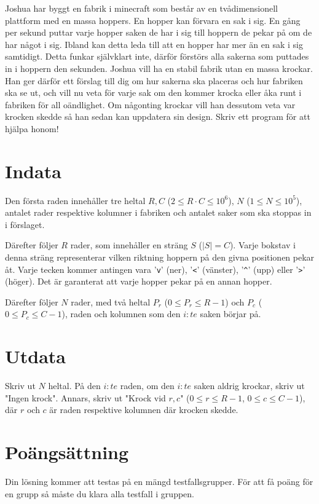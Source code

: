Joshua har byggt en fabrik i minecraft som består av en tvådimensionell plattform med en massa hoppers. En hopper kan förvara en sak i sig.
En gång per sekund puttar varje hopper saken de har i sig till hoppern de pekar på om de har något i sig. Ibland kan detta leda till att en hopper har mer än en sak i sig samtidigt.
Detta funkar självklart inte, därför förstörs alla sakerna som puttades in i hoppern den sekunden. Joshua vill ha en stabil fabrik utan en massa krockar. 
Han ger därför ett förslag till dig om hur sakerna ska placeras och hur fabriken ska se ut, och vill nu veta för varje sak om den kommer krocka eller åka runt i fabriken för all oändlighet.
Om någonting krockar vill han dessutom veta var krocken skedde så han sedan kan uppdatera sin design. Skriv ett program för att hjälpa honom!

\section*{Indata}
Den första raden innehåller tre heltal $R, C$ ($2 \le R \cdot C \le 10^6$), $N$ ($1 \le N \le 10^5$), antalet rader respektive kolumner i fabriken
och antalet saker som ska stoppas in i förslaget.

Därefter följer $R$ rader, som innehåller en sträng $S$ ($|S| = C$). Varje bokstav i denna sträng representerar vilken riktning hoppern på den givna positionen pekar åt.
Varje tecken kommer antingen vara '\texttt{v}' (ner), '\texttt{<}' (vänster), '\texttt{\^}' (upp) eller '\texttt{>}' (höger). Det är garanterat att varje hopper pekar på en annan hopper.

Därefter följer $N$ rader, med två heltal $P_r$ ($0 \le P_r \le R-1$) och $P_c$ ($0 \le P_c \le C-1$), raden och kolumnen som den $i:te$ saken börjar på. 

\section*{Utdata}
Skriv ut $N$ heltal. På den $i:te$ raden, om den $i:te$ saken aldrig krockar, skriv ut "Ingen krock". Annars, skriv ut "Krock vid $r, c$" ($0 \le r \le R-1$, $0 \le c \le C-1$), där 
$r$ och $c$ är raden respektive kolumnen där krocken skedde.

\section*{Poängsättning}
Din lösning kommer att testas på en mängd testfallsgrupper.
För att få poäng för en grupp så måste du klara alla testfall i gruppen.

